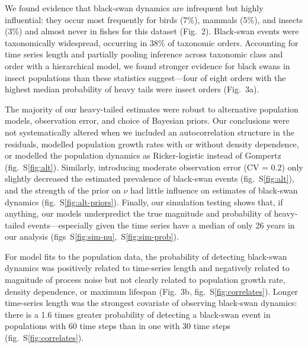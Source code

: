 We found evidence that black-swan dynamics are infrequent but highly
influential: they occur most frequently for birds (7\%), mammals (5\%), and
insects (3\%) and almost never in fishes for this dataset (Fig.~2). Black-swan
events were taxonomically widespread, occurring in 38\% of taxonomic orders.
Accounting for time series length and partially pooling inference across
taxonomic class and order with a hierarchical model, we found stronger evidence
for black swans in insect populations than these statistics suggest---four of
eight orders with the highest median probability of heavy tails were insect
orders (Fig.~3a).

The majority of our heavy-tailed estimates were robust to alternative
population models, observation error, and choice of Bayesian priors. Our
conclusions were not systematically altered when we included an autocorrelation
structure in the residuals, modelled population growth rates with or without
density dependence, or modelled the population dynamics as Ricker-logistic
instead of Gompertz (fig.~S\ref{fig:alt}). Similarly, introducing moderate
observation error (CV = 0.2) only slightly decreased the estimated prevalence
of black-swan events (fig.~S\ref{fig:alt}), and the strength of the prior on
\(\nu\) had little influence on estimates of black-swan dynamics
(fig.~S\ref{fig:alt-priors}). Finally, our simulation testing shows that, if
anything, our models underpredict the true magnitude and probability of
heavy-tailed events---especially given the time series have a median of only 26
years in our analysis (figs~S\ref{fig:sim-nu},~S\ref{fig:sim-prob}).

For model fits to the population data, the probability of detecting black-swan
dynamics was positively related to time-series length and negatively related to
magnitude of process noise but not clearly related to population growth rate,
density dependence, or maximum lifespan (Fig.~3b, fig.~S\ref{fig:correlates}).
Longer time-series length was the strongest covariate of observing black-swan
dynamics: there is a 1.6 times greater probability of detecting a black-swan
event in populations with 60 time steps than in one with 30 time steps
(fig.~S\ref{fig:correlates}).


